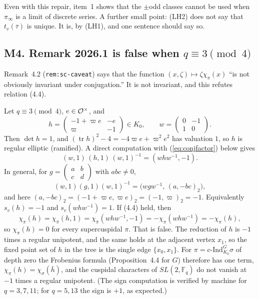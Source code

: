 \documentclass[12pt,letterpaper]{article}
\newcommand{\tr}{\operatorname{tr}}
\newcommand{\ov}[1]{\overline{#1}}
\theoremstyle{plain}
\begin{document}
Even with this repair, item~1 shows that the $\pm$odd classes cannot be
used when $\pi_\infty$ is a limit of discrete series. A further small
point: (LH2) does not say that $t_v(\ov\tau)$ is unique. It is, by (LH1),
and one sentence should say so.

\subsection*{M4. Remark 2026.1 is false when \texorpdfstring{$q\equiv3\pmod4$}{q = 3 mod 4}}

Remark~4.2 (\texttt{rem:sc-caveat}) says that the function
$(x,\zeta)\mapsto\zeta\chi_\pi(x)$ ``is not obviously invariant under
conjugation.'' It is not invariant, and this refutes relation (4.4).

Let $q\equiv3\pmod4$, $e\in{\cal O}^\times$, and
\[
h=\begin{pmatrix}-1+\varpi e&-e\\ \varpi&-1\end{pmatrix}\in K_0,\qquad
w=\begin{pmatrix}0&-1\\1&0\end{pmatrix}.
\]
Then $\det h=1$, and $(\tr h)^2-4=-4\varpi e+\varpi^2e^2$ has valuation
$1$, so $h$ is regular elliptic (ramified). A direct computation with
(\ref{eq:conjfactor}) below gives
\[
(w,1)\,(h,1)\,(w,1)^{-1}=(whw^{-1},-1).
\]
In general, for $g=\left(\begin{smallmatrix}a&b\\c&d\end{smallmatrix}\right)$
with $abc\neq0$,
\begin{equation}\label{eq:conjfactor}
(w,1)(g,1)(w,1)^{-1}=\bigl(wgw^{-1},\,(a,-bc)_2\bigr),
\end{equation}
and here $(a,-bc)_2=(-1+\varpi e,\varpi e)_2=(-1,\varpi)_2=-1$.
Equivalently $s_v(h)=-1$ and $s_v(whw^{-1})=1$. If (4.4) held, then
\[
\chi_\pi(h)=\chi_{\ov\pi}(h,1)=\chi_{\ov\pi}(whw^{-1},-1)
=-\chi_\pi(whw^{-1})=-\chi_\pi(h),
\]
so $\chi_\pi(h)=0$ for every supercuspidal $\pi$. That is false. The reduction of $h$ is $-1$ times a regular unipotent,
and the same holds at the adjacent vertex $x_1$, so the fixed point set of
$h$ in the tree is the single edge $\{x_0,x_1\}$. For
$\pi=\text{c-Ind}_{K_0}^{G}\sigma$ of depth zero the Frobenius formula
(Proposition~4.4 for $G$) therefore has one term,
$\chi_\pi(h)=\chi_\sigma(\bar h)$, and the cuspidal characters of
$SL(2,\mathbb{F}_q)$ do not vanish at $-1$ times a regular unipotent. (The
sign computation is verified by machine for $q=3,7,11$; for $q=5,13$ the
sign is $+1$, as expected.)
\end{document}
